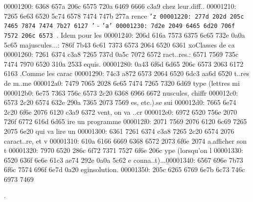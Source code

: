 \begin{soluti
00000210: 6f6e 7d0a 2020 5c62 6567 696e 7b6c 7374  on}
\begin{lst
00000220: 6c69 7374 696e 677d 5b6c 616e 6775 6167  listing}[languag
00000230: 653d 6261 7368 5d0a 2020 2020 6769 7420  e=bash]
\begin{lst
00000330: 6c69 7374 696e 677d 5b6c 616e 6775 6167  listing}[languag
00000340: 653d 435d 0a23 696e 636c 7564 6520 3c73  e=C]
\begin{cente
000003e0: 727d 0a20 205c 736c 204f 6e20 7661 206d  r}
\begin{solu
00000490: 7469 6f6e 7d0a 2020 5c62 6567 696e 7b6c  tion}
\begin{l
000004a0: 7374 6c69 7374 696e 677d 5b6c 616e 6775  stlisting}[langu
000004b0: 6167 653d 6261 7368 5d0a 2020 2020 6364  age=bash]
\begin{so
00000540: 6c75 7469 6f6e 7d0a 2020 5c62 6567 696e  lution}
\begin{solution}
\begin{lstlis
00000630: 7469 6e67 7d5b 6c61 6e67 7561 6765 3d62  ting}[language=b
00000640: 6173 685d 0a20 2020 202e 2f65 7865 7263  ash]
\begin{center}
\begin{ce
00000880: 6e74 6572 7d0a 2020 5c66 626f 787b 7e5c  nter}
\begin{ite
00000c80: 6d69 7a65 7d0a 5c69 7465 6d20 5c74 6578  mize}
00001200: 6368 657a 206c 6575 720a 6469 6666 c3a9  chez leur.diff..
00001210: 7265 6e63 6520 5c74 6578 7474 747b 277a  rence \texttt{'z
00001220: 277d 202d 205c 7465 7874 7474 7b27 6127  '} - \texttt{'a'
00001230: 7d2e 2049 6465 6d20 706f 7572 206c 6573  }. Idem pour les
00001240: 206d 616a 7573 6375 6c65 732e 0a0a 5c65   majuscules...: 786f 7b43 6c61 7373 6573 2064 6520 6361  xo{Classes de ca
00001260: 7261 6374 c3a8 7265 737d 0a5c 7072 6572  ract..res}.: 6571 7569 735c 7474 7970 6520 310a 2533  equis.%
00001280: 0a43 6f6d 6d65 206c 6573 2063 6172 6163  .Comme les carac
00001290: 74c3 a872 6573 2064 6520 6dc3 aa6d 6520  t..res de m..me 
000012a0: 7479 7065 2028 6c65 7474 7265 7320 6d69  type (lettres mi
000012b0: 6e75 7363 756c 6573 2c20 6368 6966 6672  nuscules, chiffr
000012c0: 6573 2c20 6574 632e 290a 7365 2073 7569  es, etc.).se sui
000012d0: 7665 6e74 2c20 6f6e 2076 6120 c3a9 6372  vent, on va ..cr
000012e0: 6972 6520 756e 2070 726f 6772 616d 6d65  ire un programme
000012f0: 2071 7569 2076 6120 6c69 7265 2075 6e20   qui va lire un 
00001300: 6361 7261 6374 c3a8 7265 2c20 6574 2076  caract..re, et v
00001310: 610a 6166 6669 6368 6572 2073 6f6e 2074  a.afficher son t
00001320: 7970 6520 286c 6f72 7371 7527 6f6e 206c  ype (lorsqu'on l
00001330: 6520 636f 6e6e 61c3 ae74 292e 0a0a 5c62  e conna..t)...\b
00001340: 6567 696e 7b73 6f6c 7574 696f 6e7d 0a20  egin{solution}. 
00001350: 205c 6265 6769 6e7b 6c73 746c 6973 7469   \begin{lstlisti
00001360: 6e67 7d5b 6c61 6e67 7561 6765 3d43 5d0a  ng}[language=C].

\end{lstlisti
00001360: 6e67 7d5b 6c61 6e67 7561 6765 3d43 5d0a  ng}
\end{ite
00000c80: 6d69 7a65 7d0a 5c69 7465 6d20 5c74 6578  mize}
\end{ce
00000880: 6e74 6572 7d0a 2020 5c66 626f 787b 7e5c  nter}
\end{center}
\end{lstlis
00000630: 7469 6e67 7d5b 6c61 6e67 7561 6765 3d62  ting}
\end{solution}
\end{so
00000540: 6c75 7469 6f6e 7d0a 2020 5c62 6567 696e  lution}
\end{l
000004a0: 7374 6c69 7374 696e 677d 5b6c 616e 6775  stlisting}
\end{solu
00000490: 7469 6f6e 7d0a 2020 5c62 6567 696e 7b6c  tion}
\end{cente
000003e0: 727d 0a20 205c 736c 204f 6e20 7661 206d  r}
\end{lst
00000330: 6c69 7374 696e 677d 5b6c 616e 6775 6167  listing}
\end{lst
00000220: 6c69 7374 696e 677d 5b6c 616e 6775 6167  listing}
\end{soluti
00000210: 6f6e 7d0a 2020 5c62 6567 696e 7b6c 7374  on}
